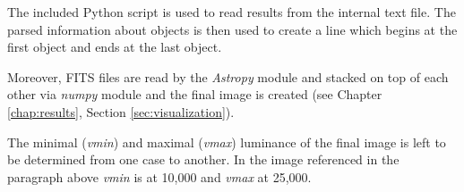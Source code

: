 	The included Python script is used to read results from the internal text file. The parsed information about objects is then used to create a line which begins at the first object and ends at the last object.
	
	Moreover, FITS files are read by the \emph{Astropy} module and stacked on top of each other via \emph{numpy} module and the final image is created (see Chapter \ref{chap:results}, Section \ref{sec:visualization}).
	
	The minimal (\emph{vmin}) and maximal (\emph{vmax}) luminance of the final image is left to be determined from one case to another. In the image referenced in the paragraph above \emph{vmin} is at 10,000 and \emph{vmax} at 25,000.
